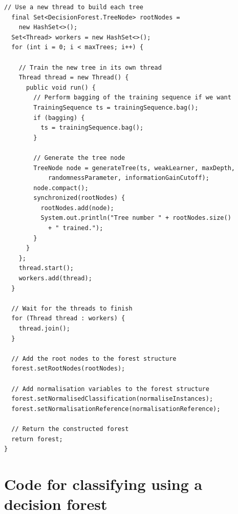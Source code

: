 \documentclass[12pt,twoside,notitlepage]{report}
\begin{document}
\begin{lstlisting}[caption={The implementation code for training a decision forest.}, label={lst:actualTrainForest}]
  // Use a new thread to build each tree
  final Set<DecisionForest.TreeNode> rootNodes = 
    new HashSet<>();
  Set<Thread> workers = new HashSet<>(); 
  for (int i = 0; i < maxTrees; i++) {
    
    // Train the new tree in its own thread
    Thread thread = new Thread() {
      public void run() {
        // Perform bagging of the training sequence if we want
        TrainingSequence ts = trainingSequence.bag();
        if (bagging) {
          ts = trainingSequence.bag();
        }
        
        // Generate the tree node
        TreeNode node = generateTree(ts, weakLearner, maxDepth, 
            randomnessParameter, informationGainCutoff);
        node.compact();
        synchronized(rootNodes) {
          rootNodes.add(node);
          System.out.println("Tree number " + rootNodes.size() 
            + " trained.");
        }
      } 
    };
    thread.start();
    workers.add(thread);
  }
  
  // Wait for the threads to finish
  for (Thread thread : workers) {
    thread.join();
  }
  
  // Add the root nodes to the forest structure
  forest.setRootNodes(rootNodes);
  
  // Add normalisation variables to the forest structure
  forest.setNormalisedClassification(normaliseInstances);
  forest.setNormalisationReference(normalisationReference);
  
  // Return the constructed forest
  return forest;
}
      \end{lstlisting}












\cleardoublepage
\chapter{Code for classifying using a decision forest} \label{app:classify_tree}
\end{document}
